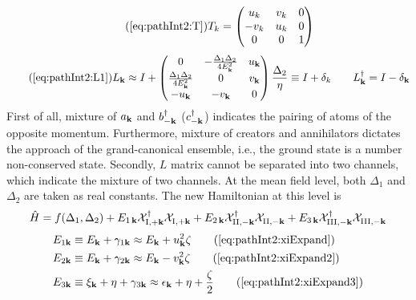 \begin{equation}\tag{\ref{eq:pathInt2:T}}
T_k=\mtrx{u_k&v_k&0\\-v_k&u_k&0\\0&0&1}
\end{equation}
\begin{equation}\tag{\ref{eq:pathInt2:L1}}
L_{\vk}\approx{}I+
\mtrx{0&-\frac{\Delta_{1}{}\Delta_{2}{}}{4E^{2}_{\vk}}&u_{\vk}\\
\frac{\Delta_{1}{}\Delta_{2}{}}{4E^{2}_{\vk}}&0&v_{\vk}\\
-u_{\vk}&-v_{\vk}&0
}\frac{\Delta_{2}{}}{\eta}
\equiv{}I+\delta_{k}\qquad
L^{\dg}_{\vk}=I-\delta_{\vk}
\end{equation}
First of all, mixture of $a_{\mathbf{k}}$ and $b^{\dagger}_{-\mathbf{k}}$ ($c^{\dagger}_{-\mathbf{k}}$) indicates the pairing of atoms of the opposite momentum. Furthermore,   mixture of creators and annihilators dictates the approach of the grand-canonical ensemble, i.e., the ground state is a number non-conserved state.   Secondly, $L$ matrix cannot be separated into two channels, which indicate the mixture of two channels.   At the mean field level, both $\Delta_{1}$ and $\Delta_{2}$ are taken as real constants.  The new Hamiltonian at this level is 
\begin{equation}
\hat{H}=f(\Delta_{1},\Delta_{2})+E_{1\,\mathbf{k}}\mathcal{X}^{\dagger}_{\text{I},+\mathbf{k}}\mathcal{X}^{}_{\text{I},+\mathbf{k}}
+E_{2\,\mathbf{k}}\mathcal{X}^{\dagger}_{\text{II},-\mathbf{k}}\mathcal{X}^{}_{\text{II},-\mathbf{k}}
+E_{3\,\mathbf{k}}\mathcal{X}^{\dagger}_{\text{III},-\mathbf{k}}\mathcal{X}^{}_{\text{III},-\mathbf{k}}
\end{equation}
\begin{align}
E_{1\vk}&\equiv{}E_{\vk}+\gamma_{1\vk}\approx{}E_{\vk}+u_{\vk}^{2}\zeta\tag{\ref{eq:pathInt2:xiExpand}}\\
E_{2\vk}&\equiv{}E_{\vk}+\gamma_{2\vk}
\approx{}E_{\vk}-v_{\vk}^{2}\zeta\tag{\ref{eq:pathInt2:xiExpand2}}\\
E_{3\vk}&\equiv{}\xi_{\vk}+\eta+\gamma_{3\vk}\approx{}\epsilon_{\vk}+\eta+\frac{\zeta}{2}
\tag{\ref{eq:pathInt2:xiExpand3}}
\end{align}



